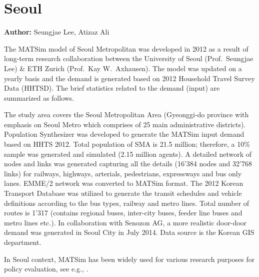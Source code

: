\section{Seoul}
\label{ch:seoul}
\hfill \textbf{Author:} Seungjae Lee, Atizaz Ali

The MATSim model of Seoul Metropolitan was developed in 2012 as a result of long-term research collaboration between the University of Seoul (Prof.\ Seungjae Lee) \& ETH Zurich (Prof.\ Kay W.\ Axhausen). The model was updated on a yearly basis and the demand is generated based on 2012 Household Travel Survey Data (HHTSD). The brief statistics related to the demand (input) are summarized as follows. 

The study area covers the Seoul Metropolitan Area (Gyeonggi-do province with emphasis on Seoul Metro which comprises of 25 main administrative districts). Population Synthesizer was developed to generate the MATSim input demand based on HHTS 2012. Total population of SMA is 21.5 million; therefore, a 10\% sample was generated and simulated (2.15 million agents). A detailed network of nodes and links was generated capturing all the details (16'384 nodes and 32'768 links) for railways, highways, arterials, pedestrians, expressways and bus only lanes. EMME/2 network was converted to MATSim format. The 2012 Korean Transport Database was utilized to generate the transit schedules and vehicle definitions according to the bus types, railway and metro lines. Total number of routes is 1'317 (contains regional buses, inter-city buses, feeder line buses and metro lines etc.). In collaboration with Senozon AG, a more realistic door-door demand was generated in Seoul City in July 2014. Data source is the Korean GIS department.

In Seoul context, MATSim has been widely used for various research purposes for policy evaluation, see e.g., \citet[][]{KimEtAl_IJHE_2012, LeeAli_unpub_IWUTSCD_2014}.

